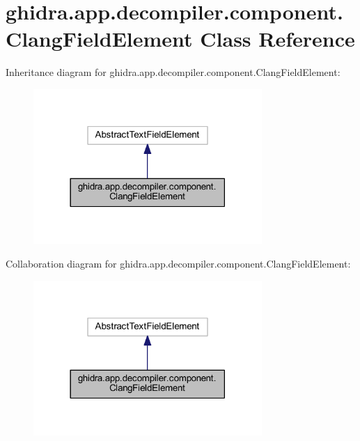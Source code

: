 \hypertarget{classghidra_1_1app_1_1decompiler_1_1component_1_1_clang_field_element}{}\section{ghidra.\+app.\+decompiler.\+component.\+Clang\+Field\+Element Class Reference}
\label{classghidra_1_1app_1_1decompiler_1_1component_1_1_clang_field_element}


Inheritance diagram for ghidra.\+app.\+decompiler.\+component.\+Clang\+Field\+Element\+:
\nopagebreak
\begin{figure}[H]
\begin{center}
\leavevmode
\includegraphics[width=246pt]{classghidra_1_1app_1_1decompiler_1_1component_1_1_clang_field_element__inherit__graph}
\end{center}
\end{figure}


Collaboration diagram for ghidra.\+app.\+decompiler.\+component.\+Clang\+Field\+Element\+:
\nopagebreak
\begin{figure}[H]
\begin{center}
\leavevmode
\includegraphics[width=246pt]{classghidra_1_1app_1_1decompiler_1_1component_1_1_clang_field_element__coll__graph}
\end{center}
\end{figure}
